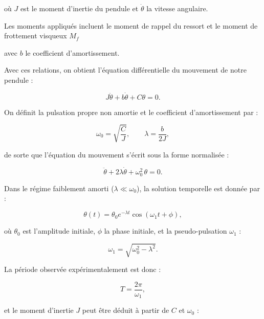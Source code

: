 où $J$ est le moment d’inertie du pendule et $\dot{\theta}$ la vitesse angulaire.

Les moments appliqués incluent le moment de rappel du ressort et le moment de frottement visqueux $M_f$ 

avec $b$ le coefficient d’amortissement.

Avec ces relations, on obtient l’équation différentielle du mouvement de notre pendule :

\begin{equation}
J\ddot{\theta} + b\dot{\theta} + C\theta = 0.
\label{eq:edo}
\end{equation}

On définit la pulsation propre non amortie et le coefficient d’amortissement par :

\begin{equation}
\omega_0 = \sqrt{\frac{C}{J}}, \qquad \lambda = \frac{b}{2J},
\label{eq:lambda}
\end{equation}

de sorte que l’équation du mouvement s’écrit sous la forme normalisée :

\begin{equation}
\ddot{\theta} + 2\lambda\dot{\theta} + \omega_0^2\,\theta = 0.
\label{eq:cara}
\end{equation}

Dans le régime faiblement amorti ($\lambda \ll \omega_0$), la solution temporelle est donnée par :

\begin{equation}
\theta(t)=\theta_0 e^{-\lambda t}\cos(\omega_1 t+\phi),
\label{eq:solution}
\end{equation}

où $\theta_0$ est l’amplitude initiale, $\phi$ la phase initiale, et la pseudo-pulsation $\omega_1$ :

\begin{equation}
\omega_1=\sqrt{\omega_0^2 - \lambda^2}.
\label{eq:w}
\end{equation}

La période observée expérimentalement est donc :

\begin{equation}
T = \frac{2\pi}{\omega_1},
\label{eq:t}
\end{equation}

et le moment d’inertie $J$ peut être déduit à partir de $C$ et $\omega_0$ :


